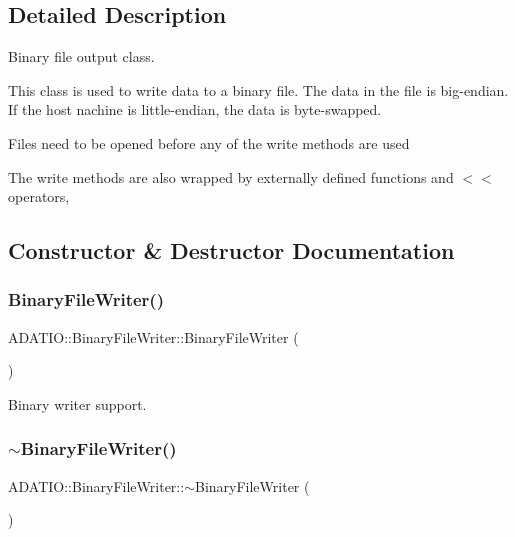\subsection{Detailed Description}
Binary file output class. 

This class is used to write data to a binary file. The data in the file is big-\/endian. If the host nachine is little-\/endian, the data is byte-\/swapped.

Files need to be opened before any of the write methods are used

The write methods are also wrapped by externally defined functions and $<$$<$ operators, 

\subsection{Constructor \& Destructor Documentation}
\mbox{\label{classADATIO_1_1BinaryFileWriter_aa0579bad52db7809ed5d30b964aa3443}} 
\subsubsection{\texorpdfstring{BinaryFileWriter()}{BinaryFileWriter()}\hspace{0.1cm}{\footnotesize\ttfamily [1/6]}}
{\footnotesize\ttfamily A\+D\+A\+T\+I\+O\+::\+Binary\+File\+Writer\+::\+Binary\+File\+Writer (\begin{DoxyParamCaption}{ }\end{DoxyParamCaption})}



Binary writer support. 

\mbox{\label{classADATIO_1_1BinaryFileWriter_ae74f92826c49450ba710f22300718ada}} 
\subsubsection{\texorpdfstring{$\sim$BinaryFileWriter()}{~BinaryFileWriter()}\hspace{0.1cm}{\footnotesize\ttfamily [1/3]}}
{\footnotesize\ttfamily A\+D\+A\+T\+I\+O\+::\+Binary\+File\+Writer\+::$\sim$\+Binary\+File\+Writer (\begin{DoxyParamCaption}{ }\end{DoxyParamCaption})}

